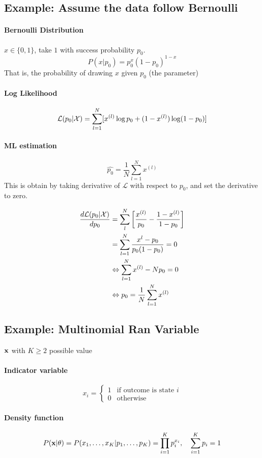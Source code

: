 \subsection{Example: Assume the data follow Bernoulli}
\paragraph{Bernoulli Distribution} $x \in\{0, 1\}$, take $1$ with success
probability $p_0$.
\[P(x|p_0) = p_0^x{(1-p_0)}^{1-x}\]
That is, the probability of drawing $x$ given $p_0$ (the parameter)

\paragraph{Log Likelihood}\[\mathcal{L}(p_0|\mathcal{X}) = \sum_{l=1}^N[x^{(l)}\log
p_0+(1-x^{(l)})\log(1-p_0)]\]
\paragraph{ML estimation} 
\[\hat{p_0} = \frac{1}{N}\sum_{l=1}^N x^{(l)}\]
This is obtain by taking derivative of $\mathcal{L}$ with respect to
$p_0$, and set the derivative to zero.

\begin{align*}
    \frac{d \mathcal{L}(p_0|\mathcal{X})}{d p_0} & = \sum_l^N\left[
        \frac{x^{(l)}}{p_0} - \frac{1-x^{(l)}}{1-p_0}
    \right] \\
    &= \sum_{l=1}^N \frac{x^l - p_0}{p_0(1-p_0)} = 0 \\
    &\Leftrightarrow \sum_{l=1}^N x^{(l)} - Np_0 = 0 \\
    &\Leftrightarrow p_0 = \frac{1}{N}\sum_{l=1}^N x^{(l)}
\end{align*}

\subsection{Example: Multinomial Ran Variable} 
$\mathbf{x}$ with $K\geq 2$ possible value
\paragraph{Indicator variable} \[x_i = \begin{cases}1 & \mbox{if outcome
    is state }i \\ 0 & \mbox{otherwise}\end{cases}\]
\paragraph{Density function}
\[ P(\mathbf{x}|\theta) = P(x_1,\dots, x_K|p_1,\dots, p_K) =
\prod^K_{i=1}p_i^{x_i}, \quad 
\sum_{i=1}^K p_i = 1 \]

